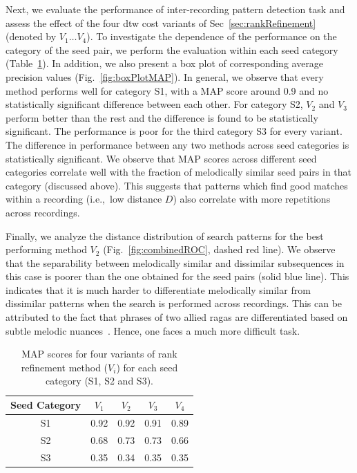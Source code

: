 
Next, we evaluate the performance of inter-recording pattern detection task and assess the effect of the four \gls{dtw} cost variants of Sec~\ref{sec:rankRefinement} (denoted by $V_1 \dots V_4$). To investigate the dependence of  the performance on the category of the seed pair, we perform the evaluation within each seed category (Table~\ref{tab:meanAveragePrecision}). In addition, we also present a box plot of corresponding average precision values (Fig.~\ref{fig:boxPlotMAP}). In general, we observe that every method performs well for category S1, with a MAP score around 0.9 and no statistically significant difference between each other. For category S2, $V_2$ and $V_3$ perform better than the rest and the difference is found to be statistically significant. The performance is poor for the third category S3 for every variant. The difference in performance between any two methods across seed categories is statistically significant. We observe that MAP scores across different seed categories correlate well with the fraction of melodically similar seed pairs in that category (discussed above). This suggests that patterns which find good matches within a recording (i.e.,~low distance $D$) also correlate with more repetitions across recordings.

Finally, we analyze the distance distribution of search patterns for the best performing method $V_2$ (Fig.~\ref{fig:combinedROC}, dashed red line). We observe that the separability between melodically similar and dissimilar subsequences in this case is poorer than the one obtained for the seed pairs (solid blue line). This indicates that it is much harder to differentiate melodically similar from dissimilar patterns when the search is performed across recordings. This can be attributed to the fact that phrases of two allied \glspl{raga} are differentiated based on subtle melodic nuances~\cite{Viswanathan2004}. Hence, one faces a much more difficult task. 

\begin{table} 
	\centering
	\caption{MAP scores for four variants of rank refinement method ($V_i$) for each seed category (S1, S2 and S3).}
	\label{tab:meanAveragePrecision}
	
	\begin{tabular}{ c | c c c c}
		\hline\hline
		Seed Category   & $V_1$		&	$V_2$ & $V_3$	 &	$V_4$ 	\\	
		\hline
		S1 & 0.92    &	0.92		&	0.91    &	0.89\\
		S2 & 0.68    &	0.73		&	0.73    &	0.66\\
		S3 & 0.35    &	0.34    &	0.35    &	0.35\\
		\hline\hline
	\end{tabular}
	
\end{table}

